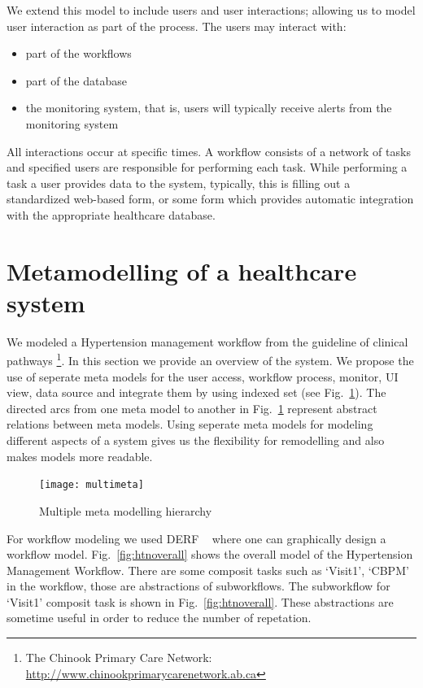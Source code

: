 \documentclass[a4paper]{llncs}
\begin{document}
We extend this model to include users and user interactions; allowing us to model user interaction as part of the process.  The users may interact with:  
\begin{itemize}
 \item part of the workflows
 \item part of the database
 \item the monitoring system, that is, users will typically receive alerts from the monitoring system
\end{itemize}

All interactions occur at specific times. A workflow consists of a network of tasks and specified users are responsible for performing each task. While performing a task a user provides data 
to the system, typically, this is filling out a standardized web-based form, or some form which provides automatic integration with the appropriate healthcare database.

\section{Metamodelling of a healthcare system}
We modeled a Hypertension management workflow from the guideline of clinical pathways \footnote{The Chinook Primary Care Network: \url{http://www.chinookprimarycarenetwork.ab.ca}}. 
In this section we provide an overview of the system. 
We propose the use of seperate meta models for the user access, workflow process, monitor, UI view, data source and integrate them by using indexed set (see Fig.~\ref{fig:multimeta}).
The directed arcs from one meta model to another in Fig.~\ref{fig:multimeta} represent abstract relations between meta models. 
Using seperate meta models for modeling different aspects of a system gives us the flexibility for remodelling and also makes models more readable. 

\begin{figure}
  \begin{center}
    \texttt{[image: multimeta]}
  \end{center} 
  \caption{Multiple meta modelling hierarchy}
  \label{fig:multimeta}  
\end{figure}



For workflow modeling we used DERF ~\cite{RutleMacCaullEtAl2012ECMFA,RutleWangEtAl2012FHIES} where one can graphically design a workflow model. 
Fig.~\ref{fig:htnoverall} shows the overall model of the Hypertension Management Workflow. 
There are some composit tasks such as `Visit1', `CBPM' in the workflow, those are abstractions of subworkflows. 
The subworkflow for `Visit1' composit task is shown in Fig.~\ref{fig:htnoverall}. 
These abstractions are sometime useful in order to reduce the number of repetation. 
\end{document}
